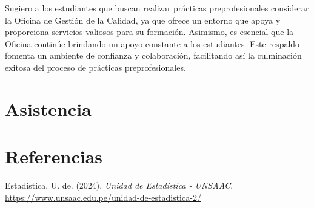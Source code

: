 \documentclass[
  12pt,
  letterpaper,
]{scrreprt}
\newlength{\cslhangindent}
\newenvironment{CSLReferences}[2] %
 {\begin{list}{}{%
  \setlength{\itemindent}{0pt}
  \setlength{\leftmargin}{0pt}
  \setlength{\parsep}{0pt}
  \ifodd #1
   \setlength{\leftmargin}{\cslhangindent}
   \setlength{\itemindent}{-1\cslhangindent}
  \fi
  \setlength{\itemsep}{#2\baselineskip}}}
 {\end{list}}
\begin{document}
Sugiero a los estudiantes que buscan realizar prácticas preprofesionales
considerar la Oficina de Gestión de la Calidad, ya que ofrece un entorno
que apoya y proporciona servicios valiosos para su formación. Asimismo,
es esencial que la Oficina continúe brindando un apoyo constante a los
estudiantes. Este respaldo fomenta un ambiente de confianza y
colaboración, facilitando así la culminación exitosa del proceso de
prácticas preprofesionales.


\chapter{Asistencia}\label{asistencia}


\chapter*{Referencias}\label{referencias}


\label{refs}
\begin{CSLReferences}{1}{0}
Estadística, U. de. (2024). \emph{Unidad de Estadística - UNSAAC}.
\url{https://www.unsaac.edu.pe/unidad-de-estadistica-2/}

\end{CSLReferences}
\end{document}
